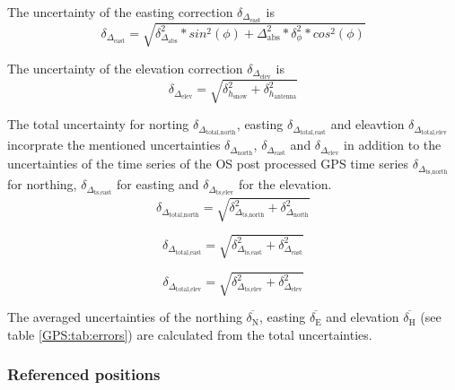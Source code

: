 The uncertainty of the easting correction $\delta_{\Delta_{\text{east}}}$ is
\begin{equation}
	\delta_{\Delta_{\text{east}}} = \sqrt{\delta_{\Delta_{\text{abs}}}^2 * sin^2(\phi) + \Delta_{\text{abs}}^2 * \delta_{\phi}^2 * cos^2(\phi)}
\end{equation}

The uncertainty of the elevation correction $\delta_{\Delta_{\text{elev}}}$ is
\begin{equation}
\delta_{\Delta_{\text{elev}}} = \sqrt{\delta_{h_{\text{snow}}}^2 + \delta_{h_{\text{antenna}}}^2}
\end{equation}
	
The total uncertainty for norting $\delta_{\Delta_{\text{total,north}}}$, easting $\delta_{\Delta_{\text{total,east}}}$ and eleavtion $\delta_{\Delta_{\text{total,elev}}}$ incorprate the mentioned uncertainties $\delta_{\Delta_{\text{north}}}$, $\delta_{\Delta_{\text{east}}}$ and $\delta_{\Delta_{\text{elev}}}$ in addition to the uncertainties of the time series of the OS post processed GPS time series $\delta_{\Delta_{\text{ts,north}}}$ for northing, $\delta_{\Delta_{\text{ts,east}}}$ for easting and $\delta_{\Delta_{\text{ts,elev}}}$ for the elevation.
\begin{equation}
	\delta_{\Delta_{\text{total,north}}} = \sqrt{\delta_{\Delta_{\text{ts,north}}}^2 + \delta_{\Delta_{\text{north}}}^2}
	\label{GPS:eq:errnorth}
\end{equation}

\begin{equation}
	\delta_{\Delta_{\text{total,east}}} = \sqrt{\delta_{\Delta_{\text{ts,east}}}^2 + \delta_{\Delta_{\text{east}}}^2}
	\label{GPS:eq:erreast}
\end{equation}

\begin{equation}
	\delta_{\Delta_{\text{total,elev}}} = \sqrt{\delta_{\Delta_{\text{ts,elev}}}^2 +\delta_{\Delta_{\text{elev}}}^2}
	\label{GPS:eq:errnelev}
\end{equation}

The averaged uncertainties of the northing $ \overline{\delta_{\text{N}}} $, easting $ \overline{\delta_{\text{E}}} $ and elevation $ \overline{\delta_{\text{H}}} $ (see table \ref{GPS:tab:errors}) are calculated from the total uncertainties.

\subsubsection*{Referenced positions}


